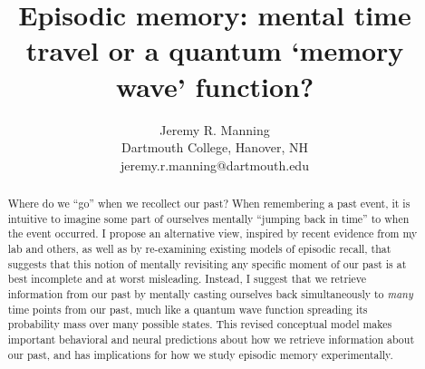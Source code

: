 \documentclass{article}
\title{Episodic memory: mental time travel or a quantum `memory wave' function?}
\author{Jeremy R. Manning\\Dartmouth College, Hanover, NH\\jeremy.r.manning@dartmouth.edu}
\begin{document}
\maketitle

\begin{abstract}
Where do we ``go'' when we recollect our past?  When remembering a past event, it is intuitive to imagine some part of ourselves mentally ``jumping back in time'' to when the event occurred. I propose an alternative view, inspired by recent evidence from my lab and others, as well as by re-examining existing models of episodic recall, that suggests that this notion of mentally revisiting any specific moment of our past is at best incomplete and at worst misleading.  Instead, I suggest that we retrieve information from our past by mentally casting ourselves back simultaneously to \textit{many} time points from our past, much like a quantum wave function spreading its probability mass over many possible states.  This revised conceptual model makes important behavioral and neural predictions about how we retrieve information about our past, and has implications for how we study episodic memory experimentally.
\end{abstract}
\end{document}
